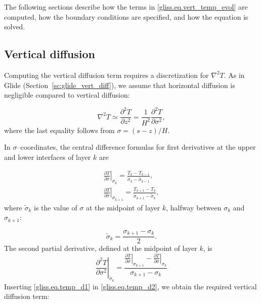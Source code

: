 The following sections describe how the terms in \eqref{gliss.eq.vert_temp_evol} are computed,
how the boundary conditions are specified, and how the equation is solved. 

\subsection{Vertical diffusion}

Computing the vertical diffusion term requires a discretization for ${\nabla}^{2}T$.
As in Glide (Section~\ref{sc:glide_vert_diff}), we assume that horizontal diffusion is
negligible compared to vertical diffusion:

\begin{equation}
  {{\nabla }^{2}}T\simeq \frac{{{\partial }^{2}}T}{\partial {{z}^{2}}}=\frac{1}{{{H}^{2}}}\frac{{{\partial }^{2}}T}{\partial {{\sigma }^{2}}},
\end{equation}
%
where the last equality follows from $\sigma = (s-z)/H$.

In $\sigma$--coordinates, the central difference formulas
for first derivatives at the upper and lower interfaces of layer $k$ are

\begin{equation}
  \label{gliss.eq.temp_d1}
  \begin{split}
    {{\left. \frac{\partial T}{\partial \sigma } \right|}_{{{\sigma }_{k}}}} =
    \frac{{{T}_{k}}-{{T}_{k-1}}}{{{{\tilde{\sigma }}}_{k}}-{{{\tilde{\sigma }}}_{k-1}}},\\
    {{\left. \frac{\partial T}{\partial \sigma } \right|}_{{{\sigma }_{k+1}}}} =
    \frac{{{T}_{k+1}}-{{T}_{k}}}{{{{\tilde{\sigma }}}_{k+1}}-{{{\tilde{\sigma }}}_{k}}},
  \end{split}
\end{equation}
%
where $\tilde{\sigma}_k$ is the value of $\sigma$ at the midpoint of layer $k$, 
halfway between $\sigma_{k}$ and $\sigma_{k+1}$:

\begin{equation}
  \tilde{\sigma}_k = \frac{\sigma_{k+1} - \sigma_{k}} {2}.
\end{equation}
%
The second partial derivative, defined at the midpoint of layer $k$, is
\begin{equation}
  \label{gliss.eq.temp_d2}
        {{\left. \frac{{{\partial }^{2}}T}{\partial {{\sigma }^{2}}} \right|}_{{{{\tilde{\sigma }}}_{k}}}} =
        \frac{{{\left. \frac{\partial T}{\partial \sigma } \right|}_{{{\sigma }_{k+1}}}} - {{\left. \frac{\partial T}{\partial \sigma } \right|}_{{{\sigma }_{k}}}}} 
             {{{\sigma }_{k+1}}-{{\sigma }_{k}}}
\end{equation}
%
Inserting \eqref{gliss.eq.temp_d1} in \eqref{gliss.eq.temp_d2}, we obtain
the required vertical diffusion term:

